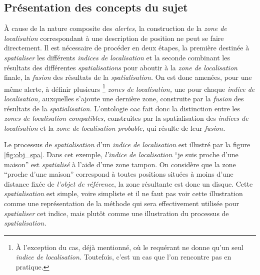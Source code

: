 \subsection{Présentation des concepts du sujet}



À cause de la nature composite des \emph{alertes,} la construction de
la \emph{zone de localisation} correspondant à une description de
position ne peut se faire directement. Il est nécessaire de procéder
en deux étapes, la première destinée à \emph{spatialiser} les
différents \emph{indices de localisation} et la seconde combinant les
résultats des différentes \emph{spatialisations} pour aboutir à la
\emph{zone de localisation} finale, \ie la \emph{fusion} des résultats
de la \emph{spatialisation.} On est donc amenées, pour une même
alerte, à définir plusieurs \footnote{À l'exception du cas, déjà
  mentionné, où le requérant ne donne qu'un seul \emph{indice de
    localisation.}  Toutefois, c'est un cas que l'on rencontre pas en
  pratique.}  \emph{zones de localisation,} une pour chaque
\emph{indice de localisation,} auxquelles s'ajoute une dernière zone,
construite par la \emph{fusion} des résultats de la
\emph{spatialisation.}  L'ontologie \ac{oac} \autocite{Viry2019} fait
donc la distinction entre les \emph{zones de localisation
  compatibles,} construites par la spatialisation des \emph{indices de
  localisation} et la \emph{zone de localisation probable,} qui
résulte de leur \emph{fusion.}

Le processus de \emph{spatialisation} d'un \emph{indice de
  localisation} est illustré par la figure \ref{fig:obj_spa}. Dans cet
exemple, \emph{l'indice de localisation} \enquote{je suis proche d'une
  maison} est \emph{spatialisé} à l'aide d'une zone tampon. On
considère que la zone \enquote{proche d'une maison} correspond à
toutes positions situées à moins d'une distance fixée de \emph{l'objet
  de référence}, la zone résultante est donc un disque. Cette
\emph{spatialisation} est simple, voire simpliste et il ne faut pas
voir cette illustration comme une représentation de la méthode qui
sera effectivement utilisée pour \emph{spatialiser} cet indice, mais
plutôt comme une illustration du processus de \emph{spatialisation.}

